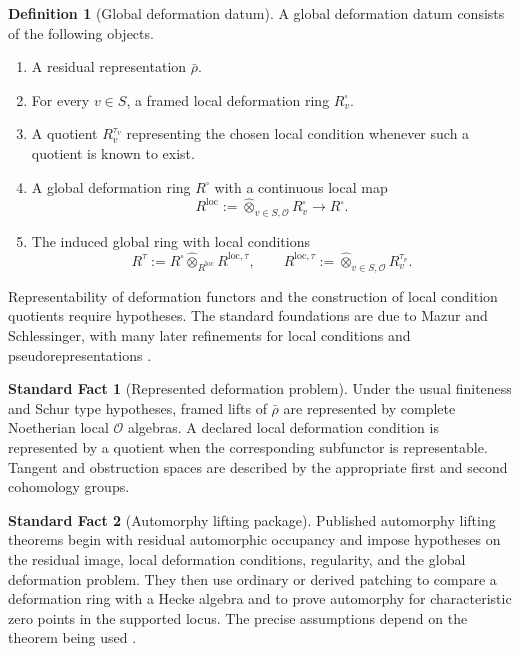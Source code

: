 \documentclass{aomart}
\theoremstyle{definition}
\newtheorem{definition}[definition]{Definition}
\newtheorem{standardfact}[standardfact]{Standard Fact}
\theoremstyle{remark}
\newcommand{\OO}{\mathcal O}
\newcommand{\wideotimes}{\mathbin{\widehat\otimes}}
\begin{document}
\begin{definition}[Global deformation datum]\label{def:global_datum}
A global deformation datum consists of the following objects.
\begin{enumerate}
\item A residual representation \(\bar\rho\).
\item For every \(v\in S\), a framed local deformation ring \(R_v^\square\).
\item A quotient \(R_v^{\tau_v}\) representing the chosen local condition whenever such a quotient is known to exist.
\item A global deformation ring \(R^\square\) with a continuous local map
\[
R^{\mathrm{loc}}:=\wideotimes_{v\in S,\OO}R_v^\square
\longrightarrow R^\square.
\]
\item The induced global ring with local conditions
\[
R^{\tau}:=R^\square\wideotimes_{R^{\mathrm{loc}}}R^{\mathrm{loc},\tau},
\qquad
R^{\mathrm{loc},\tau}:=\wideotimes_{v\in S,\OO}R_v^{\tau_v}.
\]
\end{enumerate}
\end{definition}

Representability of deformation functors and the construction of local condition quotients require hypotheses. The standard foundations are due to Mazur and Schlessinger, with many later refinements for local conditions and pseudorepresentations \cite{Mazur1989,Schlessinger1968,BellaicheChenevier2009}.

\begin{standardfact}[Represented deformation problem]\label{fact:represented_deformation}
Under the usual finiteness and Schur type hypotheses, framed lifts of \(\bar\rho\) are represented by complete Noetherian local \(\OO\) algebras. A declared local deformation condition is represented by a quotient when the corresponding subfunctor is representable. Tangent and obstruction spaces are described by the appropriate first and second cohomology groups.
\end{standardfact}

\begin{standardfact}[Automorphy lifting package]\label{fact:automorphy_package}
Published automorphy lifting theorems begin with residual automorphic occupancy and impose hypotheses on the residual image, local deformation conditions, regularity, and the global deformation problem. They then use ordinary or derived patching to compare a deformation ring with a Hecke algebra and to prove automorphy for characteristic zero points in the supported locus. The precise assumptions depend on the theorem being used \cite{ClozelHarrisTaylor2008,BarnetLambGeeGeraghtyTaylor2014,CalegariGeraghty2018,Thorne2012,MiagkovThorne2023,AllenEtAl2023}.
\end{standardfact}
\end{document}
